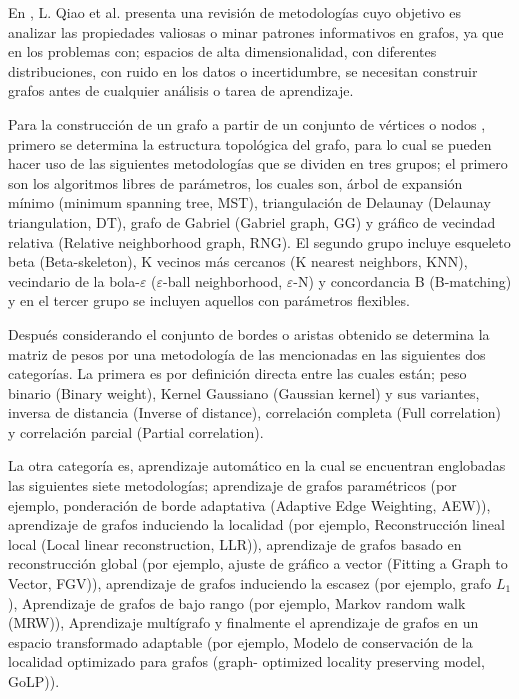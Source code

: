 
En \cite{QIAO2018336}, L. Qiao et al. presenta una revisi\'on de 
 metodolog\'ias cuyo objetivo es analizar las propiedades valiosas o minar 
 patrones informativos en grafos, ya que en los problemas con; espacios de 
 alta dimensionalidad, con diferentes distribuciones, con ruido en los 
 datos o incertidumbre, se necesitan construir grafos antes de cualquier 
 an\'alisis o tarea de aprendizaje. 


Para la construcci\'on de un grafo a partir de un conjunto de v\'ertices o 
 nodos \cite{QIAO2018336}, primero se determina la estructura topol\'ogica 
 del grafo, para lo cual se pueden hacer uso de las siguientes 
 metodolog\'ias que se dividen en tres grupos; el primero son los 
 algoritmos libres de par\'ametros, los cuales son, \'arbol de expansi\'on 
 m\'inimo (minimum spanning tree, MST), triangulaci\'on de Delaunay 
 (Delaunay triangulation, DT), grafo de Gabriel (Gabriel graph, GG) y 
 gr\'afico de vecindad relativa (Relative neighborhood graph, RNG).  El 
 segundo grupo incluye esqueleto beta (Beta-skeleton), K vecinos m\'as 
 cercanos (K nearest neighbors, KNN), vecindario de la bola-$\varepsilon$ 
 ($\varepsilon$-ball neighborhood, $\varepsilon$-N) y concordancia B 
 (B-matching) y en el tercer grupo se incluyen aquellos con par\'ametros 
 flexibles.


Despu\'es considerando el conjunto de bordes \cite{QIAO2018336} o aristas 
 obtenido se determina la matriz de pesos por una metodolog\'ia de las 
 mencionadas en las siguientes dos categor\'ias. La primera es por 
 definici\'on directa entre las cuales est\'an; peso binario (Binary 
 weight), Kernel Gaussiano (Gaussian kernel) y sus variantes, inversa de 
 distancia (Inverse of distance), correlaci\'on completa (Full correlation) 
 y correlaci\'on parcial (Partial correlation). 


La otra categor\'ia es, aprendizaje autom\'atico \cite{QIAO2018336} en la 
 cual se encuentran englobadas las siguientes siete metodolog\'ias; 
 aprendizaje de grafos param\'etricos (por ejemplo, ponderaci\'on de borde 
 adaptativa (Adaptive Edge Weighting, AEW)), aprendizaje de grafos 
 induciendo la localidad (por ejemplo, Reconstrucci\'on lineal local (Local 
 linear reconstruction, LLR)), aprendizaje de grafos basado en 
 reconstrucci\'on global (por ejemplo, ajuste de gr\'afico a vector (Fitting 
 a Graph to Vector, FGV)), aprendizaje de grafos induciendo la escasez (por 
 ejemplo, grafo $L_1$), Aprendizaje de grafos de bajo rango (por ejemplo, 
 Markov random walk (MRW)), Aprendizaje mult\'igrafo y finalmente el 
 aprendizaje de grafos en un espacio transformado adaptable (por ejemplo, 
 Modelo de conservaci\'on de la localidad optimizado para grafos (graph-
 optimized locality preserving model, GoLP)). 

